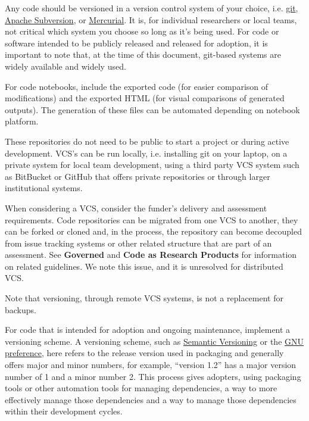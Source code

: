 \documentclass{article}
\newcounter{subsubsubsection}[subsubsection]
\begin{document}
Any code should be versioned in a version control system of your choice, i.e. \href{https://git-scm.com/} {git}, \href{https://subversion.apache.org/} {Apache Subversion}, or \href{https://www.mercurial-scm.org/} {Mercurial}. It is, for individual researchers or local teams, not critical which system you choose so long as it’s being used. For code or software intended to be publicly released and released for adoption, it is important to note that, at the time of this document, git-based systems are widely available and widely used. 
 
For code notebooks, include the exported code (for easier comparison of modifications) and the exported HTML (for visual comparisons of generated outputs). The generation of these files can be automated depending on notebook platform. 
 
These repositories do not need to be public to start a project or during active development. VCS’s can be run locally, i.e. installing git on your laptop, on a private system for local team development, using a third party VCS system such as BitBucket or GitHub that offers private repositories or through larger institutional systems. 
 
When considering a VCS, consider the funder’s delivery and assessment requirements. Code repositories can be migrated from one VCS to another, they can be forked or cloned and, in the process, the repository can become decoupled from issue tracking systems or other related structure that are part of an assessment. See \textbf{Governed} and \textbf{Code as Research Products} for information on related guidelines. We note this issue, and it is unresolved for distributed VCS. 
 
Note that versioning, through remote VCS systems, is not a replacement for backups. 

For code that is intended for adoption and ongoing maintenance, implement a versioning scheme. A versioning scheme, such as \href{http://semver.org/} {Semantic Versioning} or the \href{https://www.gnu.org/prep/standards/html_node/Releases.html#index-version-numbers_002c-for-releases} {GNU preference}, here refers to the release version used in packaging and generally offers major and minor numbers, for example, “version 1.2” has a major version number of 1 and a minor number 2. This process gives adopters, using packaging tools or other automation tools for managing dependencies, a way to more effectively manage those dependencies and a way to manage those dependencies within their development cycles. 
 
\end{document}
